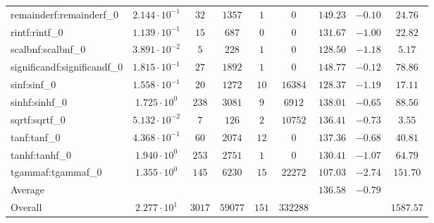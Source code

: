 \begin{tabular}{|l|c|c|c|c|c|c|c|c|}
remainderf:remainderf\_0     & $ 2.144 \cdot 10^{-1} $ & $ 32     $ & $ 1357  $ & $ 1   $ & $ 0      $ & $ 149.23      $ & $ -0.10   $ & $ 24.76   $ \\
rintf:rintf\_0               & $ 1.139 \cdot 10^{-1} $ & $ 15     $ & $ 687   $ & $ 0   $ & $ 0      $ & $ 131.67      $ & $ -1.00   $ & $ 22.82   $ \\
scalbnf:scalbnf\_0           & $ 3.891 \cdot 10^{-2} $ & $ 5      $ & $ 228   $ & $ 1   $ & $ 0      $ & $ 128.50      $ & $ -1.18   $ & $ 5.17    $ \\
significandf:significandf\_0 & $ 1.815 \cdot 10^{-1} $ & $ 27     $ & $ 1892  $ & $ 1   $ & $ 0      $ & $ 148.77      $ & $ -0.12   $ & $ 78.86   $ \\
sinf:sinf\_0                 & $ 1.558 \cdot 10^{-1} $ & $ 20     $ & $ 1272  $ & $ 10  $ & $ 16384  $ & $ 128.37      $ & $ -1.19   $ & $ 17.11   $ \\
sinhf:sinhf\_0               & $ 1.725 \cdot 10^{0}  $ & $ 238    $ & $ 3081  $ & $ 9   $ & $ 6912   $ & $ 138.01      $ & $ -0.65   $ & $ 88.56   $ \\
sqrtf:sqrtf\_0               & $ 5.132 \cdot 10^{-2} $ & $ 7      $ & $ 126   $ & $ 2   $ & $ 10752  $ & $ 136.41      $ & $ -0.73   $ & $ 3.55    $ \\
tanf:tanf\_0                 & $ 4.368 \cdot 10^{-1} $ & $ 60     $ & $ 2074  $ & $ 12  $ & $ 0      $ & $ 137.36      $ & $ -0.68   $ & $ 40.81   $ \\
tanhf:tanhf\_0               & $ 1.940 \cdot 10^{0}  $ & $ 253    $ & $ 2751  $ & $ 1   $ & $ 0      $ & $ 130.41      $ & $ -1.07   $ & $ 64.79   $ \\
tgammaf:tgammaf\_0           & $ 1.355 \cdot 10^{0}  $ & $ 145    $ & $ 6230  $ & $ 15  $ & $ 22272  $ & $ 107.03      $ & $ -2.74   $ & $ 151.70  $ \\
\hline
Average                      & $                     $ & $        $ & $       $ & $     $ & $        $ & $ 136.58      $ & $ -0.79   $ & $         $ \\
\hline
Overall                      & $ 2.277 \cdot 10^{1}  $ & $ 3017   $ & $ 59077 $ & $ 151 $ & $ 332288 $ & $             $ & $         $ & $ 1587.57 $ \\
\hline
\end{tabular}

